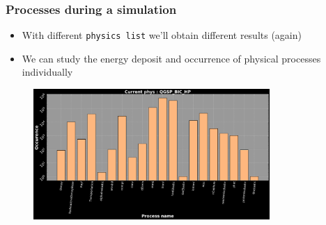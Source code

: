 \begin{frame}
\frametitle{Processes during a simulation}

\begin{block}{}
	\begin{itemize}
		\item With different \texttt{physics list} we'll obtain different results (again)
		\item We can study the energy deposit and occurrence of physical processes individually
	\end{itemize}
\end{block}

\begin{figure}
	\includegraphics[width=0.8\textwidth]{images/process_dist_E100_phQGSP_BIC_HP.png}
\end{figure}

\end{frame}